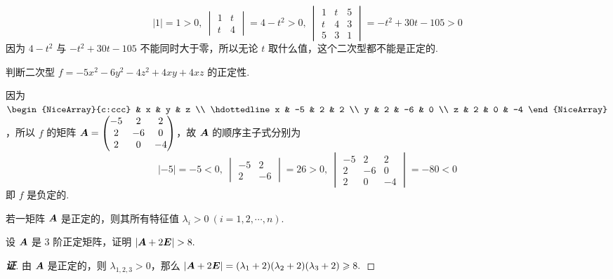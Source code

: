 \begin{solution}
\begin{enumerate}[label=(\arabic{*})]
              $$|1|=1>0,~\begin{vmatrix}
                      1 & t \\
                      t & 4
                  \end{vmatrix}=4-t^2>0,~\begin{vmatrix}
                      1 & t & 5 \\
                      t & 4 & 3 \\
                      5 & 3 & 1
                  \end{vmatrix}=-t^2+30t-105>0$$
              因为 $4-t^2$ 与 $-t^2+30t-105$ 不能同时大于零，所以无论 $t$ 取什么值，这个二次型都不能是正定的.
    \end{enumerate}
\end{solution}

\begin{example}
    判断二次型 $f=-5x^2-6y^2-4z^2+4xy+4xz$ 的正定性.
\end{example}
\begin{solution}
    因为 $\begin{NiceArray}{c:ccc}
        & x  & y  & z  \\ \hdottedline
            x & -5 & 2  & 2  \\
            y & 2  & -6 & 0  \\
            z & 2  & 0  & -4
    \end{NiceArray}$，所以 $f$ 的矩阵 $\vb*{A}=\begin{pmatrix}
            -5 & 2  & 2  \\
            2  & -6 & 0  \\
            2  & 0  & -4
        \end{pmatrix}$，故 $\vb*{A}$ 的顺序主子式分别为
    $$|-5|=-5<0,~\begin{vmatrix}
            -5 & 2  \\
            2  & -6
        \end{vmatrix}=26>0,~\begin{vmatrix}
            -5 & 2  & 2  \\
            2  & -6 & 0  \\
            2  & 0  & -4
        \end{vmatrix}=-80<0$$
    即 $f$ 是负定的.
\end{solution}

\begin{theorem}[特征值与正定性]
    若一矩阵 $\vb*{A}$ 是正定的，则其所有特征值 $\lambda_i>0~ (i=1,2,\cdots,n).$
\end{theorem}
\begin{example}
    设 $\vb*{A}$ 是 3 阶正定矩阵，证明 $|\vb*{A}+2\vb*{E}|>8.$
\end{example}
\begin{proof}[{\songti \textbf{证}}]
    由 $\vb*{A}$ 是正定的，则 $\lambda_{1,2,3}>0$，那么 $|\vb*{A}+2\vb*{E}|=(\lambda_1+2)(\lambda_2+2)(\lambda_3+2)\geqslant 8.$
\end{proof}

